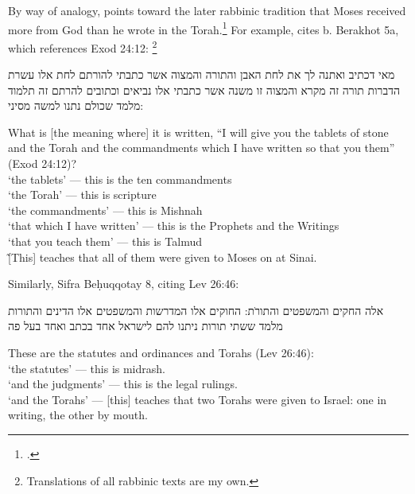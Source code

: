 By way of analogy, \vanderkam points toward the later rabbinic tradition that Moses received more from God than he wrote in the Torah.\footnote{\cite[28--31]{vanderkam_metso-etal2010}.} For example, \vanderkam cites b. Berakhot 5a, which references Exod 24:12:%
    \footnote{Translations of all rabbinic texts are my own.}

\begin{aramaictranslation}
    מאי דכתיב ואתנה לך את לחת האבן והתורה והמצוה אשר כתבתי להורתם לחת אלו עשרת הדברות תורה זה מקרא והמצוה זו משנה אשר כתבתי אלו נביאים וכתובים להרתם זה תלמוד מלמד שכולם נתנו למשה מסיני: 
\end{aramaictranslation}

\begin{translation}
    What is [the meaning where] it is written, ``I will give you the tablets of stone and the Torah and the commandments which I have written so that you them'' (Exod 24:12)?\\
    \-\hspace{2em}`the tablets' --- this is the ten commandments\\
    \-\hspace{2em}`the Torah' --- this is scripture\\
    \-\hspace{2em}`the commandments' --- this is Mishnah\\
    \-\hspace{2em}`that which I have written' --- this is the Prophets and the Writings\\
    \-\hspace{2em}`that you teach them' --- this is Talmud\\\~
    [This] teaches that all of them were given to Moses on at Sinai.
\end{translation}
\noindent
Similarly, Sifra Beḥuqqotay 8, citing Lev 26:46:
\begin{aramaictranslation}
    אלה החקים והמשפטים והתורֹת: החוקים אלו המדרשות והמשפטים אלו הדינים והתורות מלמד ששתי תורות ניתנו להם לישראל אחד בכתב ואחד בעל פה
\end{aramaictranslation}
\begin{translation}
    These are the statutes and ordinances and Torahs (Lev 26:46):\\
    \-\hspace{2em} `the statutes' --- this is midrash.\\
    \-\hspace{2em} `and the judgments' --- this is the legal rulings.\\
    \-\hspace{2em} `and the Torahs' --- [this] teaches that two Torahs were given to Israel: one in writing, the other by mouth.
\end{translation}

